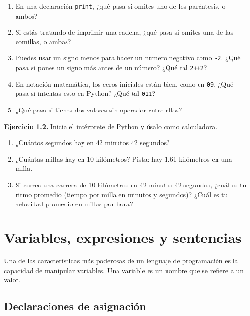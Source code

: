 \documentclass[12pt,letterpaper]{book}
\begin{document}
\begin{enumerate}
\item En una declaración \texttt{print}, ¿qué pasa si omites uno de los paréntesis, o ambos?

\item Si estás tratando de imprimir una cadena, ¿qué pasa si omites una de las comillas, o ambas?

\item Puedes usar un signo menos para hacer un número negativo como \texttt{-2}. ¿Qué pasa si pones un signo más antes de un número? ¿Qué tal \texttt{2++2}?

\item En notación matemática, los ceros iniciales están bien, como en \texttt{09}. ¿Qué pasa si intentas esto en Python? ¿Qué tal \texttt{011}?

\item ¿Qué pasa si tienes dos valores sin operador entre ellos?
\end{enumerate}

\textbf{Ejercicio 1.2.} Inicia el intérprete de Python y úsalo como calculadora.

\begin{enumerate}
\item ¿Cuántos segundos hay en 42 minutos 42 segundos?

\item ¿Cuántas millas hay en 10 kilómetros? Pista: hay 1.61 kilómetros en una milla.

\item Si corres una carrera de 10 kilómetros en 42 minutos 42 segundos, ¿cuál es tu ritmo promedio (tiempo por milla en minutos y segundos)? ¿Cuál es tu velocidad promedio en millas por hora?
\end{enumerate}









\chapter{Variables, expresiones y sentencias}
Una de las características más poderosas de un lenguaje de programación es la capacidad de manipular variables. Una variable es un nombre que se refiere a un valor.

\section{Declaraciones de asignación}
\end{document}
